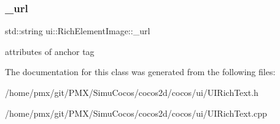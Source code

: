 \subsubsection{\texorpdfstring{\+\_\+url}{\_url}}
{\footnotesize\ttfamily std\+::string ui\+::\+Rich\+Element\+Image\+::\+\_\+url\hspace{0.3cm}{\ttfamily [protected]}}

attributes of anchor tag 

The documentation for this class was generated from the following files\+:\begin{DoxyCompactItemize}
\item 
/home/pmx/git/\+P\+M\+X/\+Simu\+Cocos/cocos2d/cocos/ui/U\+I\+Rich\+Text.\+h\item 
/home/pmx/git/\+P\+M\+X/\+Simu\+Cocos/cocos2d/cocos/ui/U\+I\+Rich\+Text.\+cpp\end{DoxyCompactItemize}
